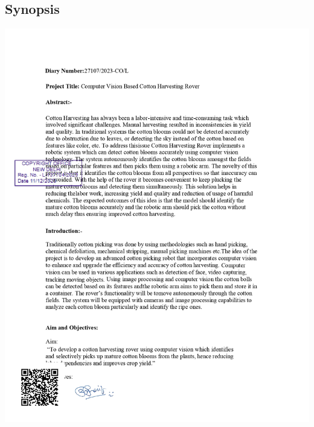 \documentclass[12pt,a4paper]{report}
\begin{document}
\subsection{Synopsis}
\includegraphics[scale =0.7]{images/copyright/synopsis_new/Synopsis_new_page-0001.jpg}
\newpage
\end{document}
